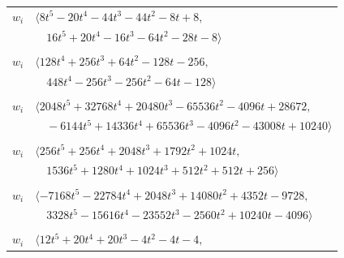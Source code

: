 \documentclass[11pt]{article}
\begin{document}
\begin{longtable}{@{}ll@{}}
$w_i$ & $\langle 8t^{5}-20t^{4}-44t^{3}-44t^{2}-8t+8,$\\
 & $\quad 16t^{5}+20t^{4}-16t^{3}-64t^{2}-28t-8\rangle$\\
\addlinespace[2pt]
\multicolumn{2}{@{}p{0.97\textwidth}@{}}{$i=5$, $D_i=64$, $\rho_{ij}$: $3{:}2, \allowbreak 8{:}1, \allowbreak 15{:}2, \allowbreak 17{:}2, \allowbreak 22{:}2, \allowbreak 27{:}1, \allowbreak 28{:}1, \allowbreak 33{:}1, \allowbreak 37{:}1$}\\
$w_i$ & $\langle 128t^{4}+256t^{3}+64t^{2}-128t-256,$\\
 & $\quad 448t^{4}-256t^{3}-256t^{2}-64t-128\rangle$\\
\addlinespace[2pt]
\multicolumn{2}{@{}p{0.97\textwidth}@{}}{$i=6$, $D_i=1024$, $\rho_{ij}$: $1{:}1, \allowbreak 4{:}2, \allowbreak 7{:}1, \allowbreak 14{:}2, \allowbreak 22{:}2, \allowbreak 24{:}2, \allowbreak 28{:}1, \allowbreak 32{:}1, \allowbreak 42{:}2, \allowbreak 52{:}1$}\\
$w_i$ & $\langle 2048t^{5}+32768t^{4}+20480t^{3}-65536t^{2}-4096t+28672,$\\
 & $\quad -6144t^{5}+14336t^{4}+65536t^{3}-4096t^{2}-43008t+10240\rangle$\\
\addlinespace[2pt]
\multicolumn{2}{@{}p{0.97\textwidth}@{}}{$i=7$, $D_i=128$, $\rho_{ij}$: $6{:}2, \allowbreak 12{:}1, \allowbreak 25{:}2, \allowbreak 40{:}1, \allowbreak 52{:}1, \allowbreak 53{:}2, \allowbreak 61{:}2$}\\
$w_i$ & $\langle 256t^{5}+256t^{4}+2048t^{3}+1792t^{2}+1024t,$\\
 & $\quad 1536t^{5}+1280t^{4}+1024t^{3}+512t^{2}+512t+256\rangle$\\
\addlinespace[2pt]
\multicolumn{2}{@{}p{0.97\textwidth}@{}}{$i=8$, $D_i=256$, $\rho_{ij}$: $5{:}2, \allowbreak 14{:}1, \allowbreak 17{:}1, \allowbreak 18{:}2, \allowbreak 22{:}2, \allowbreak 25{:}1, \allowbreak 33{:}1, \allowbreak 36{:}2, \allowbreak 38{:}2, \allowbreak 40{:}1, \allowbreak 48{:}1$}\\
$w_i$ & $\langle -7168t^{5}-22784t^{4}+2048t^{3}+14080t^{2}+4352t-9728,$\\
 & $\quad 3328t^{5}-15616t^{4}-23552t^{3}-2560t^{2}+10240t-4096\rangle$\\
\addlinespace[2pt]
\multicolumn{2}{@{}p{0.97\textwidth}@{}}{$i=9$, $D_i=4$, $\rho_{ij}$: $3{:}2, \allowbreak 4{:}1, \allowbreak 11{:}2, \allowbreak 13{:}2, \allowbreak 20{:}2, \allowbreak 38{:}2, \allowbreak 55{:}1, \allowbreak 58{:}1$}\\
$w_i$ & $\langle 12t^{5}+20t^{4}+20t^{3}-4t^{2}-4t-4,$\\

\end{longtable}
\end{document}
